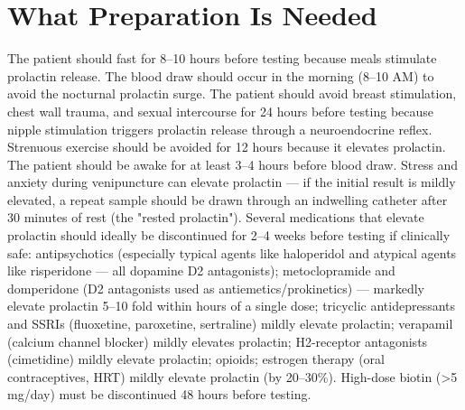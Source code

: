 \section*{What Preparation Is Needed}
The patient should fast for 8--10 hours before testing because meals stimulate prolactin release. The blood draw should occur in the morning (8--10 AM) to avoid the nocturnal prolactin surge. The patient should avoid breast stimulation, chest wall trauma, and sexual intercourse for 24 hours before testing because nipple stimulation triggers prolactin release through a neuroendocrine reflex. Strenuous exercise should be avoided for 12 hours because it elevates prolactin. The patient should be awake for at least 3--4 hours before blood draw. Stress and anxiety during venipuncture can elevate prolactin --- if the initial result is mildly elevated, a repeat sample should be drawn through an indwelling catheter after 30 minutes of rest (the "rested prolactin"). Several medications that elevate prolactin should ideally be discontinued for 2--4 weeks before testing if clinically safe: antipsychotics (especially typical agents like haloperidol and atypical agents like risperidone --- all dopamine D2 antagonists); metoclopramide and domperidone (D2 antagonists used as antiemetics/prokinetics) --- markedly elevate prolactin 5--10 fold within hours of a single dose; tricyclic antidepressants and SSRIs (fluoxetine, paroxetine, sertraline) mildly elevate prolactin; verapamil (calcium channel blocker) mildly elevates prolactin; H2-receptor antagonists (cimetidine) mildly elevate prolactin; opioids; estrogen therapy (oral contraceptives, HRT) mildly elevate prolactin (by 20--30\%). High-dose biotin (>5 mg/day) must be discontinued 48 hours before testing.

